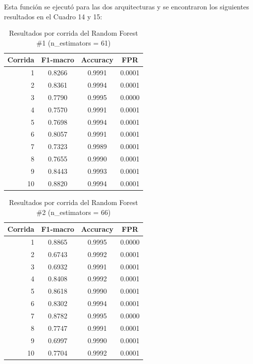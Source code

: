 \documentclass[12pt,a4paper]{article}
\begin{document}
Esta función se ejecutó para las dos arquitecturas y se encontraron los siguientes resultados en el Cuadro 14 y 15:

\begin{table}[H]
  \centering
  \begin{tabular}{rccc}
    \hline
    Corrida & F1-macro & Accuracy & FPR \\
    \hline
    1  & 0.8266 & 0.9991 & 0.0001 \\
    2  & 0.8361 & 0.9994 & 0.0001 \\
    3  & 0.7790 & 0.9995 & 0.0000 \\
    4  & 0.7570 & 0.9991 & 0.0001 \\
    5  & 0.7698 & 0.9994 & 0.0001 \\
    6  & 0.8057 & 0.9991 & 0.0001 \\
    7  & 0.7323 & 0.9989 & 0.0001 \\
    8  & 0.7655 & 0.9990 & 0.0001 \\
    9  & 0.8443 & 0.9993 & 0.0001 \\
    10 & 0.8820 & 0.9994 & 0.0001 \\
    \hline
  \end{tabular}
  \caption{Resultados por corrida del Random Forest \#1 (n\_estimators = 61)}
  \label{tab:rf1-corridas}
\end{table}

\begin{table}[H]
  \centering
  \begin{tabular}{rccc}
    \hline
    Corrida & F1-macro & Accuracy & FPR \\
    \hline
    1  & 0.8865 & 0.9995 & 0.0000 \\
    2  & 0.6743 & 0.9992 & 0.0001 \\
    3  & 0.6932 & 0.9991 & 0.0001 \\
    4  & 0.8408 & 0.9992 & 0.0001 \\
    5  & 0.8618 & 0.9990 & 0.0001 \\
    6  & 0.8302 & 0.9994 & 0.0001 \\
    7  & 0.8782 & 0.9995 & 0.0000 \\
    8  & 0.7747 & 0.9991 & 0.0001 \\
    9  & 0.6997 & 0.9990 & 0.0001 \\
    10 & 0.7704 & 0.9992 & 0.0001 \\
    \hline
  \end{tabular}
  \caption{Resultados por corrida del Random Forest \#2 (n\_estimators = 66)}
  \label{tab:rf2-corridas}
\end{table}
\end{document}
